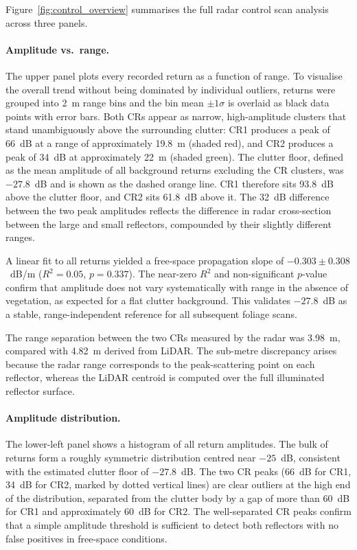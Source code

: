 Figure~\ref{fig:control_overview} summarises the full radar control scan analysis
across three panels.

\paragraph{Amplitude vs.\ range.}
The upper panel plots every recorded return as a function of range.
To visualise the overall trend without being dominated by individual outliers,
returns were grouped into 2~m range bins and the bin mean $\pm 1\sigma$ is
overlaid as black data points with error bars.
Both CRs appear as narrow, high-amplitude clusters that stand unambiguously above
the surrounding clutter: CR1 produces a peak of 66~dB at a range of approximately
19.8~m (shaded red), and CR2 produces a peak of 34~dB at approximately 22~m
(shaded green).
The clutter floor, defined as the mean amplitude of all background returns
excluding the CR clusters, was $-27.8$~dB and is shown as the dashed orange line.
CR1 therefore sits 93.8~dB above the clutter floor, and CR2 sits 61.8~dB above it.
The 32~dB difference between the two peak amplitudes reflects the difference in
radar cross-section between the large and small reflectors, compounded by their
slightly different ranges.

A linear fit to all returns yielded a free-space propagation slope of
$-0.303 \pm 0.308$~dB/m ($R^2 = 0.05$, $p = 0.337$).
The near-zero $R^2$ and non-significant $p$-value confirm that amplitude does not
vary systematically with range in the absence of vegetation, as expected for a
flat clutter background. This validates $-27.8$~dB as a stable, range-independent
reference for all subsequent foliage scans.

The range separation between the two CRs measured by the radar was 3.98~m,
compared with 4.82~m derived from LiDAR. The sub-metre discrepancy arises because
the radar range corresponds to the peak-scattering point on each reflector, whereas
the LiDAR centroid is computed over the full illuminated reflector surface.

\paragraph{Amplitude distribution.}
The lower-left panel shows a histogram of all return amplitudes.
The bulk of returns form a roughly symmetric distribution centred near $-25$~dB,
consistent with the estimated clutter floor of $-27.8$~dB.  The two CR peaks
(66~dB for CR1, 34~dB for CR2, marked by dotted vertical lines) are clear outliers
at the high end of the distribution, separated from the clutter body by a gap of
more than 60~dB for CR1 and approximately 60~dB for CR2.
The well-separated CR peaks confirm that a simple amplitude threshold is sufficient
to detect both reflectors with no false positives in free-space conditions.


